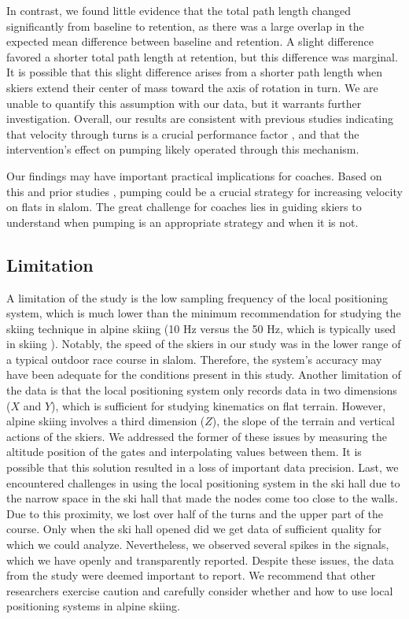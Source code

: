 \documentclass{article}
\begin{document}
In contrast, we found little evidence that the total path length changed significantly from baseline to retention, as there was a large overlap in the expected mean difference between baseline and retention. A slight difference favored a shorter total path length at retention, but this difference was marginal. It is possible that this slight difference arises from a shorter path length when skiers extend their center of mass toward the axis of rotation in turn. We are unable to quantify this assumption with our data, but it warrants further investigation. Overall, our results are consistent with previous studies indicating that velocity through turns is a crucial performance factor \cite{federolf_quantifying_2012, supej_differential_2008, sporri_turn_2012, lesnik_best_2007}, and that the intervention's effect on pumping likely operated through this mechanism.

Our findings may have important practical implications for coaches. Based on this and prior studies \cite{christian_magelssen_reinforcement_2024}, pumping could be a crucial strategy for increasing velocity on flats in slalom. The great challenge for coaches lies in guiding skiers
to understand when pumping is an appropriate strategy and when it is not. 

\subsection{Limitation}
A limitation of the study is the low sampling frequency of the local positioning system, which is much lower than the minimum recommendation for studying the skiing technique in alpine skiing (10 Hz versus the 50 Hz, which is typically used in skiing  \cite{federolf_quantifying_2012}). Notably, the speed of the skiers in our study was in the lower range of a typical outdoor race course in slalom. Therefore, the system's accuracy may have been adequate for the conditions present in this study. Another limitation of the data is that the local positioning system only records data in two dimensions ($X$ and $Y$), which is sufficient for studying kinematics on flat terrain. However, alpine skiing involves a third dimension ($Z$), the slope of the terrain and vertical actions of the skiers. We addressed the former of these issues by measuring the altitude position of the gates and interpolating values between them. It is possible that this solution resulted in a loss of important data precision. Last, we encountered challenges in using the local positioning system in the ski hall due to the narrow space in the ski hall that made the nodes come too close to the walls. Due to this proximity, we lost over half of the turns and the upper part of the course. Only when the ski hall opened did we get data of sufficient quality for which we could analyze. Nevertheless, we observed several spikes in the signals, which we have openly and transparently reported. Despite these issues, the data from the study were deemed important to report.  We recommend that other researchers exercise caution and carefully consider whether and how to use local positioning systems in alpine skiing.
\end{document}
